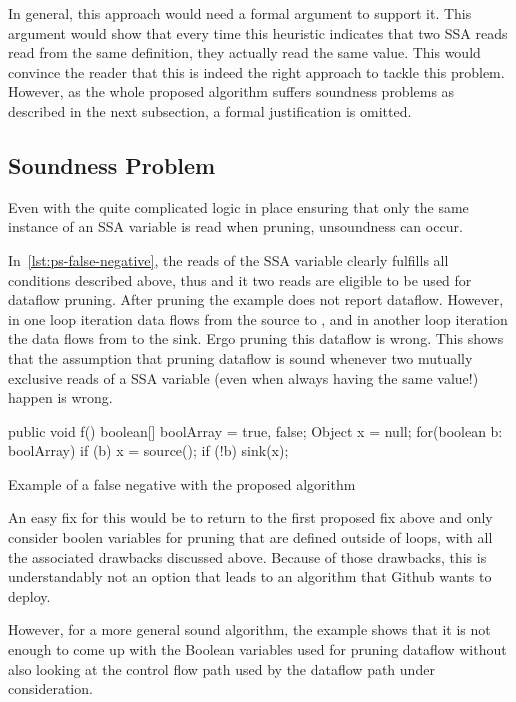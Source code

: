 In general, this approach would need a formal argument to support it.
This argument would show that every time this heuristic indicates that two
SSA reads read from
the same definition, they actually read the same value.
This would convince the reader that this is indeed the right approach 
to tackle this problem.
However, as the whole proposed algorithm suffers soundness problems as described 
in the next subsection, a formal justification is omitted.

\subsection{Soundness Problem}
\label{ssec:soundness}
Even with the quite complicated logic in place ensuring that only the same 
instance of an SSA variable is read when pruning, unsoundness can occur.

In~\autoref{lst:ps-false-negative}, the reads of the SSA variable  clearly
fulfills all conditions described above, thus  and it two reads
are eligible to be used for dataflow pruning.
After pruning the example does not report dataflow.
However, in one loop iteration data flows from the source to ,
and in another loop iteration the data flows from  to the sink.
Ergo pruning this dataflow is wrong.
This shows that the assumption that pruning dataflow is sound whenever two mutually 
exclusive reads of a SSA variable (even when always having the same value!) 
happen is wrong.

\begin{listing}[h]
    \begin{javacode}
public void f() {
    boolean[] boolArray = {true, false};
    Object x = null;
    for(boolean b: boolArray) {
        if (b) {
            x = source();
        }
        if (!b) {
            sink(x);
        }
    }
}
    \end{javacode}
    \caption{Example of a false negative with the proposed algorithm}
    \label{lst:ps-false-negative}
\end{listing}

An easy fix for this would be to return to the first proposed fix above and
only consider boolen variables for pruning that are defined outside of loops,
with all the associated drawbacks discussed above.
Because of those drawbacks, this is understandably
not an option that leads to an algorithm that Github wants to deploy.

However, for a more general sound algorithm, the example shows that it is not enough
to come up with the Boolean variables used for pruning dataflow without also 
looking at the control flow path used by the dataflow path under consideration.

